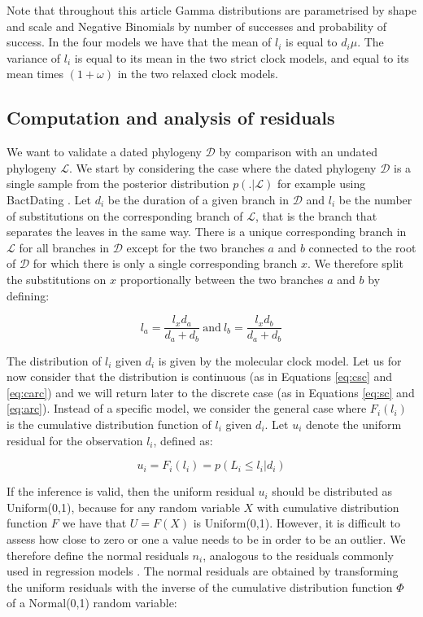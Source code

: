\documentclass{article}
\begin{document}
Note that throughout this article Gamma distributions are parametrised by shape and scale and Negative Binomials 
by number of successes and probability of success. In the four models we have that the mean of $l_i$ is equal to
$d_i \mu$. The variance of $l_i$ is equal to its mean in the two strict clock models, and equal to its mean 
times $(1+\omega)$ in the two relaxed clock models.

\subsection*{Computation and analysis of residuals}

We want to validate a dated phylogeny $\mathcal{D}$ by comparison with an undated phylogeny $\mathcal{L}$. We start by considering the case where the dated phylogeny $\mathcal{D}$ is a single sample from the posterior distribution $p(.|\mathcal{L})$ for example using BactDating \citep{Didelot2018}.
Let $d_i$ be the duration of a given branch in $\mathcal{D}$ and $l_i$ be the number of substitutions on the corresponding branch of $\mathcal{L}$, that is the branch that separates the leaves in the same way. There is a unique corresponding branch in $\mathcal{L}$ for all branches in $\mathcal{D}$ except for the two branches $a$ and $b$ connected to the root of $\mathcal{D}$ for which there is only a single corresponding branch $x$. We therefore split the substitutions on $x$ proportionally between the two branches $a$ and $b$ by defining:

\begin{equation}
l_a = \frac{l_x d_a}{d_a+d_b}\mathrm{~and~}l_b = \frac{l_x d_b}{d_a+d_b}
\end{equation}

The distribution of $l_i$ given $d_i$ is given by the molecular clock model. 
Let us for now consider that the distribution
is continuous (as in Equations \ref{eq:csc} and \ref{eq:carc}) and we will return later to the discrete case 
(as in Equations \ref{eq:sc} and \ref{eq:arc}). 
Instead of a specific model, we consider the general case where
$F_i(l_i)$ is the cumulative distribution function of $l_i$ given $d_i$.
Let $u_i$ denote the uniform residual for the observation $l_i$, defined as:

\begin{equation}
u_i=F_i(l_i)=p(L_i\leq l_i|d_i)
\label{eq:unif-resid}
\end{equation}

If the inference is valid, then the uniform residual $u_i$ 
should be distributed as Uniform(0,1), because for any random variable $X$ with cumulative distribution function $F$ we have that $U=F(X)$ is Uniform(0,1). 
However, it is difficult to assess how close to zero or one a value needs to be in order to be 
an outlier. 
We therefore define the normal residuals $n_i$, analogous to the residuals commonly used in 
regression models \citep{coxGeneralDefinitionResiduals1968,dunnRandomizedQuantileResiduals1996}. 
The normal residuals are obtained 
by transforming the uniform residuals with the inverse of the cumulative distribution function $\Phi$ 
of a Normal(0,1) random variable:
\end{document}
